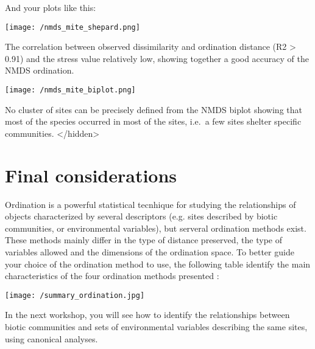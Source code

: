 \documentclass[
]{book}
\begin{document}
And your plots like this:

\texttt{[image: /nmds\_mite\_shepard.png]}

The correlation between observed dissimilarity and ordination distance
(R2 \textgreater{} 0.91) and the stress value relatively low, showing together a
good accuracy of the NMDS ordination.

\texttt{[image: /nmds\_mite\_biplot.png]}

No cluster of sites can be precisely defined from the NMDS biplot
showing that most of the species occurred in most of the sites, i.e.~a
few sites shelter specific communities. \textless/hidden\textgreater{}

\hypertarget{final-considerations}{%
\chapter{Final considerations}\label{final-considerations}}

Ordination is a powerful statistical tecnhique for studying the
relationships of objects characterized by several descriptors (e.g.
sites described by biotic communities, or environmental variables), but
serveral ordination methods exist. These methods mainly differ in the
type of distance preserved, the type of variables allowed and the
dimensions of the ordination space. To better guide your choice of the
ordination method to use, the following table identify the main
characteristics of the four ordination methods presented :

\texttt{[image: /summary\_ordination.jpg]}

In the next workshop, you will see how to identify the relationships
between biotic communities and sets of environmental variables
describing the same sites, using canonical analyses.

  
\end{document}
